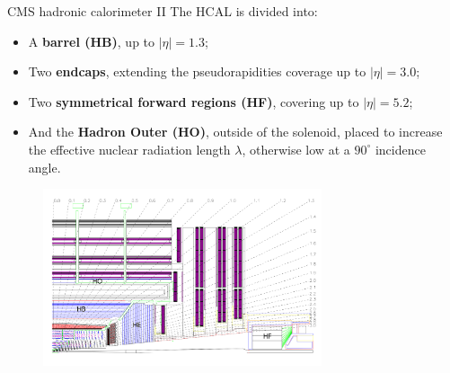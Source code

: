 \documentclass[8pt]{beamer}
\begin{document}
\begin{frame}{CMS hadronic calorimeter II}
\justifying
\vspace{5pt}
The HCAL is divided into:
\begin{itemize}
\item A \textbf{barrel (HB)}, up to $|\eta| = 1.3$;
\item Two \textbf{endcaps}, extending the pseudorapidities coverage up to $|\eta| = 3.0$;
\item Two \textbf{symmetrical forward regions (HF)}, covering up to $|\eta| = 5.2$;
\item And the \textbf{Hadron Outer (HO)}, outside of the solenoid, placed to increase the effective nuclear radiation length $\lambda$, otherwise low at a $90^{\circ}$ incidence angle.
\end{itemize} \vfill

\begin{figure}[htbp]
\begin{center}
\includegraphics[width=8.2cm, height=5.2cm]{figs/CMSHCAL.png}
\end{center}
\end{figure}
\end{frame}
\end{document}
